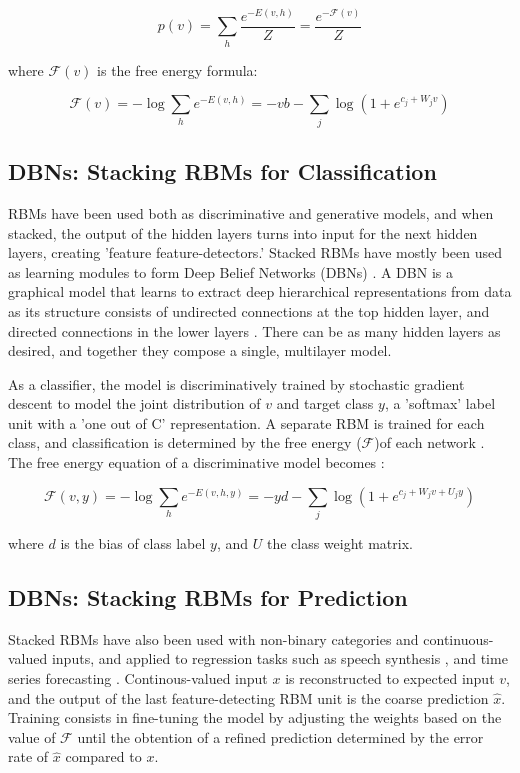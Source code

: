 \documentclass{report}
\begin{document}
\begin{equation}
p(v) =  \sum_h \frac{e^{-E(v,h)}}{Z} = \frac{e^{-\mathcal{F}(v)}}{Z}
\end{equation}

where $\mathcal{F}(v)$ is the free energy formula:

\begin{equation}
\mathcal{F}(v) = -\log \sum_h e^{-E(v,h)} = -vb - \sum_j \log (1 + e^{c_j + W_j v})
\end{equation}


\subsection{DBNs: Stacking RBMs for Classification}
RBMs have been used both as discriminative and generative models, and when stacked, the output of the hidden layers turns into input for the next hidden layers, creating 'feature feature-detectors.' Stacked RBMs have mostly been used as learning modules to form Deep Belief Networks (DBNs) \cite{Hinton} \cite{Schmah}. A DBN is a graphical model that learns to extract deep hierarchical representations from data as its structure consists of undirected connections at the top hidden layer, and directed connections in the lower layers \cite{Ngiam}. There can be as many hidden layers as desired, and together they compose a single, multilayer model.

As a classifier, the model is discriminatively trained by stochastic gradient descent to model the joint distribution of $v$ and target class $y$, a 'softmax' label unit with a 'one out of C' representation. A separate RBM is trained for each class, and classification is determined by the free energy ($\mathcal{F}$)of each network \cite{Elfwing}. The free energy equation of a discriminative model becomes \cite{Louradour}:

\begin{equation}
\mathcal{F}(v, y) = -\log \sum_h e^{-E(v,h,y)} = -yd - \sum_j \log (1 + e^{c_j + W_j v + U_j y})
\end{equation}

where $d$ is the bias of class label $y$, and $U$ the class weight matrix. 


\subsection{DBNs: Stacking RBMs for Prediction}
Stacked RBMs have also been used with non-binary categories and continuous-valued inputs, and applied to regression tasks such as speech synthesis \cite{Jaitly}, and time series forecasting \cite{Ginzburg} \cite{Kuremoto}. Continous-valued input $x$ is reconstructed to expected input $v$, and the output of the last feature-detecting RBM unit is the coarse prediction $\hat{x}$. Training consists in fine-tuning the model by adjusting the weights based on the value of $\mathcal{F}$ until the obtention of a refined prediction determined by the error rate of $\hat{x}$ compared to $x$\cite{Kuremoto}.
\end{document}
